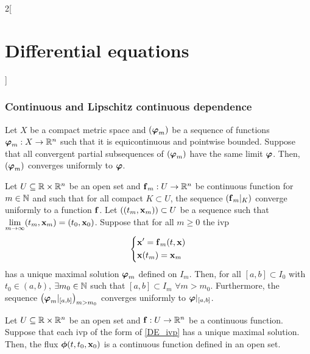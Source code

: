 \documentclass[../../../main.tex]{subfiles}
\begin{document}
\begin{multicols}{2}[\section{Differential equations}]
  \subsubsection{Continuous and Lipschitz continuous dependence}
  \begin{lemma}
    Let $X$ be a compact metric space and $(\boldsymbol{\mathrm{\varphi}}_m)$ be a sequence of functions $\boldsymbol{\mathrm{\varphi}}_m:X\rightarrow\mathbb{R}^n$ such that it is equicontinuous and pointwise bounded. Suppose that all convergent partial subsequences of $(\boldsymbol{\mathrm{\varphi}}_m)$ have the same limit $\boldsymbol{\mathrm{\varphi}}$. Then, $(\boldsymbol{\mathrm{\varphi}}_m)$ converges uniformly to $\boldsymbol{\mathrm{\varphi}}$.
  \end{lemma}
  \begin{prop}
    Let $U\subseteq\mathbb{R}\times\mathbb{R}^n$ be an open set and $\boldsymbol{\mathrm{f}}_m:U\rightarrow\mathbb{R}^n$ be continuous function for $m\in\mathbb{N}$ and such that for all compact $K\subset U$, the sequence $(\boldsymbol{\mathrm{f}}_m|_K)$ converge uniformly to a function $\boldsymbol{\mathrm{f}}$. Let $((t_m,\boldsymbol{\mathrm{x}}_m))\subset U$ be a sequence such that $\displaystyle\lim_{m\to\infty}(t_m,\boldsymbol{\mathrm{x}}_m)=(t_0,\boldsymbol{\mathrm{x}}_0)$. Suppose that for all $m\geq 0$ the ivp
    \begin{equation*}
      \left\{
      \begin{aligned}
         & \boldsymbol{\mathrm{x}}'      =\boldsymbol{\mathrm{f}}_m(t,\boldsymbol{\mathrm{x}}) \\
         & \boldsymbol{\mathrm{x}}(t_m)  =\boldsymbol{\mathrm{x}}_m
      \end{aligned}
      \right.
    \end{equation*}
    has a unique maximal solution $\boldsymbol{\mathrm{\varphi}}_m$ defined on $I_m$. Then, for all $[a,b]\subset I_0$ with $t_0\in(a,b)$, $\exists m_0\in\mathbb{N}$ such that $[a,b]\subset I_m$ $\forall m>m_0$. Furthermore, the sequence $\left(\boldsymbol{\mathrm{\varphi}}_m|_{[a,b]}\right)_{m>m_0}$ converges uniformly to $\boldsymbol{\mathrm{\varphi}}|_{[a,b]}$.
  \end{prop}
  \begin{theorem}
    Let $U\subseteq\mathbb{R}\times\mathbb{R}^n$ be an open set and $\boldsymbol{\mathrm{f}}:U\rightarrow\mathbb{R}^n$ be a continuous function. Suppose that each ivp of the form of \cref{DE_ivp} has a unique maximal solution. Then, the flux $\boldsymbol{\mathrm{\phi}}(t,t_0,\boldsymbol{\mathrm{x}}_0)$ is a continuous function defined in an open set.
  \end{theorem}
  \begin{theorem}

\end{theorem}
\end{multicols}
\end{document}
